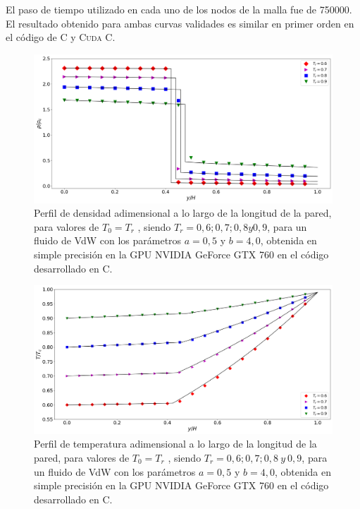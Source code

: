 El paso de tiempo utilizado en cada uno de los nodos de la malla fue de 750000. 
El resultado obtenido para ambas curvas validades es similar en primer orden en el código de \textsc{C} y \textsc{Cuda C}.

\begin{figure}[htbp]
	\centering
	\includegraphics[width=\textwidth]{figs/cap4/v_760_VdW_c_simple_rho_y}
	\caption{Perfil de densidad adimensional a lo largo de la longitud de la pared, para valores de $T_0 = T_r$ , siendo $T_r = 0,6 ; 0,7 ; 0,8 y 0,9$, para un fluido de VdW con los parámetros $a = 0,5 $ y $b = 4,0 $, obtenida en simple precisión en la GPU NVIDIA GeForce GTX 760 en el código desarrollado en \textsc{C}.}
	\label{fig:v_760_VdW_c_simple_rho_y}	
\end{figure}

\begin{figure}[htbp]
	\centering
	\includegraphics[width=\textwidth]{figs/cap4/v_760_VdW_c_simple_T_y}
	\caption{Perfil de temperatura adimensional a lo largo de la longitud de la pared, para valores de $T_0 = T_r$ , siendo $T_r = 0,6 ; 0,7 ; 0,8 \>y\> 0,9$, para un fluido de VdW con los parámetros $a = 0,5 $ y $b = 4,0 $, obtenida en simple precisión en la GPU NVIDIA GeForce GTX 760 en el código desarrollado en \textsc{C}.}
	\label{fig:v_760_VdW_c_simple_T_y}	
\end{figure}

